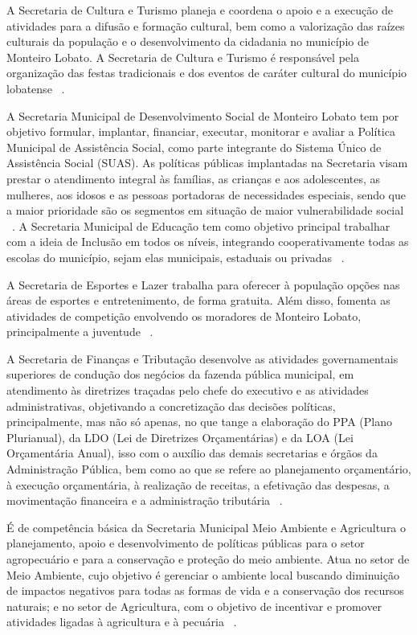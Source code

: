 A Secretaria de Cultura e Turismo planeja e coordena o apoio e a execução de atividades para a difusão e formação cultural, bem como a valorização das raízes culturais da população e o desenvolvimento da cidadania no município de Monteiro Lobato. A Secretaria de Cultura e Turismo é responsável pela organização das festas tradicionais e dos eventos de caráter cultural do município lobatense ~\cite{MonteiroLobatoSite}.

A Secretaria Municipal de Desenvolvimento Social de Monteiro Lobato tem por objetivo formular, implantar, financiar, executar, monitorar e avaliar a Política Municipal de Assistência Social, como parte integrante do Sistema Único de Assistência Social (SUAS). As políticas públicas implantadas na Secretaria visam prestar o atendimento integral às famílias, as crianças e aos adolescentes, as mulheres, aos idosos e as pessoas portadoras de necessidades especiais, sendo que a maior prioridade são os segmentos em situação de maior vulnerabilidade social ~\cite{MonteiroLobatoSite}.
A Secretaria Municipal de Educação tem como objetivo principal trabalhar com a ideia de Inclusão em todos os níveis, integrando cooperativamente todas as escolas do município, sejam elas municipais, estaduais ou privadas ~\cite{MonteiroLobatoSite}.

A Secretaria de Esportes e Lazer trabalha para oferecer à população opções nas áreas de esportes e entretenimento, de forma gratuita. Além disso, fomenta as atividades de competição envolvendo os moradores de Monteiro Lobato, principalmente a juventude ~\cite{MonteiroLobatoSite}.

A Secretaria de Finanças e Tributação desenvolve as atividades governamentais superiores de condução dos negócios da fazenda pública municipal, em atendimento às diretrizes traçadas pelo chefe do executivo e as atividades administrativas, objetivando a concretização das decisões políticas, principalmente, mas não só apenas, no que tange a elaboração do PPA (Plano Plurianual), da LDO (Lei de Diretrizes Orçamentárias) e da LOA (Lei Orçamentária Anual), isso com o auxílio das demais secretarias e órgãos da Administração Pública, bem como ao que se refere ao planejamento orçamentário, à execução orçamentária, à realização de receitas, a efetivação das despesas, a movimentação financeira e a administração tributária ~\cite{MonteiroLobatoSite}.

É de competência básica da Secretaria Municipal Meio Ambiente e Agricultura o planejamento, apoio e desenvolvimento de políticas públicas para o setor agropecuário e para a conservação e proteção do meio ambiente. Atua no setor de Meio Ambiente, cujo objetivo é gerenciar o ambiente local buscando diminuição de impactos negativos para todas as formas de vida e a conservação dos recursos naturais; e no setor de Agricultura, com o objetivo de incentivar e promover atividades ligadas à agricultura e à pecuária ~\cite{MonteiroLobatoSite}.

